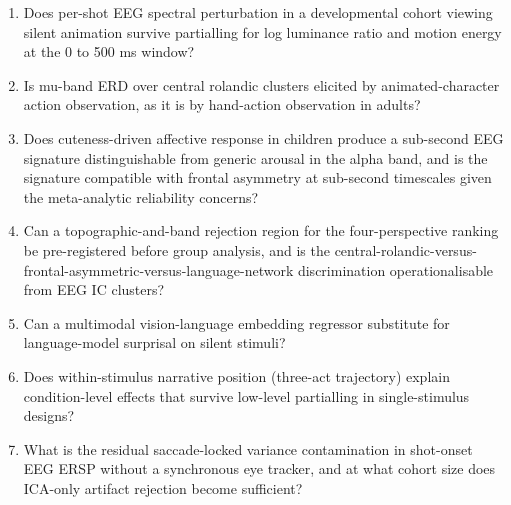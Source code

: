 \documentclass[preprint,12pt]{elsarticle}
\begin{document}
\begin{tcolorbox}[colback=green!5!white,colframe=green!40!black,title=Outstanding Questions,breakable]
\begin{enumerate}
  \item Does per-shot EEG spectral perturbation in a developmental cohort viewing silent animation survive partialling for log luminance ratio and motion energy at the 0 to 500 ms window?
  \item Is mu-band ERD over central rolandic clusters elicited by animated-character action observation, as it is by hand-action observation in adults?
  \item Does cuteness-driven affective response in children produce a sub-second EEG signature distinguishable from generic arousal in the alpha band, and is the signature compatible with frontal asymmetry at sub-second timescales given the meta-analytic reliability concerns?
  \item Can a topographic-and-band rejection region for the four-perspective ranking be pre-registered before group analysis, and is the central-rolandic-versus-frontal-asymmetric-versus-language-network discrimination operationalisable from EEG IC clusters?
  \item Can a multimodal vision-language embedding regressor substitute for language-model surprisal on silent stimuli?
  \item Does within-stimulus narrative position (three-act trajectory) explain condition-level effects that survive low-level partialling in single-stimulus designs?
  \item What is the residual saccade-locked variance contamination in shot-onset EEG ERSP without a synchronous eye tracker, and at what cohort size does ICA-only artifact rejection become sufficient?
\end{enumerate}
\end{tcolorbox}
\end{document}
